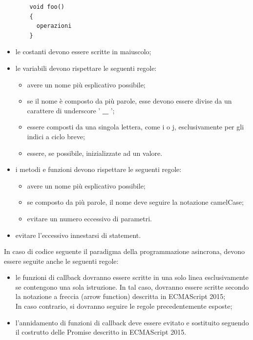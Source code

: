\begin{itemize}
\begin{lstlisting}
 	void foo()
 	{
      operazioni
 	}
 	\end{lstlisting}
 	\item le costanti devono essere scritte in maiuscolo;
 	\item le variabili devono rispettare le seguenti regole:
 	\begin{itemize}
 		\item avere un nome più esplicativo possibile;
 		\item se il nome è composto da più parole, esse devono essere divise da un carattere di underscore ' \textbf{\_} ';
 		\item essere composti da una singola lettera, come i o j, esclusivamente per gli indici a ciclo breve;
 		\item essere, se possibile, inizializzate ad un valore.
 	\end{itemize}
 	\item i metodi e funzioni devono rispettare le seguenti regole:
 	\begin{itemize}
 		\item avere un nome più esplicativo possibile;
 		\item se composto da più parole, il nome deve seguire la notazione camelCase;
 		\item evitare un numero eccessivo di parametri.
 	\end{itemize}
 	\item evitare l'eccessivo innestarsi di statement.
 \end{itemize}
In caso di codice seguente il paradigma della programmazione asincrona, devono essere seguite anche le seguenti regole:
\begin{itemize}
	\item le funzioni di callback dovranno essere scritte in una solo linea esclusivamente se contengono una sola istruzione. In tal caso, dovranno essere scritte secondo la notazione a freccia (arrow function) descritta in ECMAScript 2015;\\
	 In caso contrario, si dovranno seguire le regole precedentemente esposte;
	 \item l'annidamento di funzioni di callback deve essere evitato e sostituito seguendo il costrutto delle Promise descritto in ECMAScript 2015.
\end{itemize}

